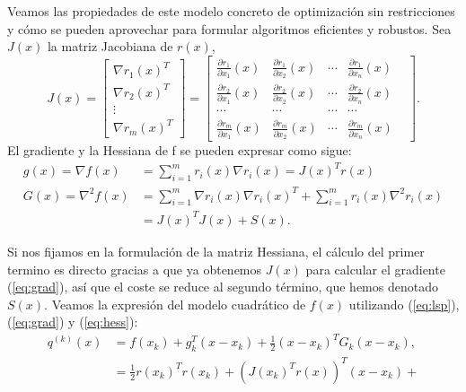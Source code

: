 \documentclass[11pt,a4paper]{book}
\theoremstyle{definition}
\theoremstyle{remark}
\begin{document}
Veamos las propiedades de este modelo concreto de optimización sin restricciones y cómo se pueden aprovechar para formular algoritmos eficientes y robustos.
Sea $J(x)$ la matriz Jacobiana de $r(x)$, 
\begin{equation}
	J(x) = 
	\begin{bmatrix}
		\nabla r_1(x)^T \\
		\nabla r_2(x)^T \\
		\vdots \\
		\nabla r_m(x)^T
	\end{bmatrix}
	=
	\begin{bmatrix}
		\frac{\partial r_1}{\partial x_1}(x) &
		\frac{\partial r_1}{\partial x_2}(x) &
		\cdots &
		\frac{\partial r_1}{\partial x_n}(x) \\
		
		\frac{\partial r_2}{\partial x_1}(x) &
		\frac{\partial r_2}{\partial x_2}(x) &
		\cdots &
		\frac{\partial r_2}{\partial x_n}(x) \\
		
		\cdots &
		\cdots &
		\cdots &
		\cdots & \\
		
		\frac{\partial r_m}{\partial x_1}(x) &
		\frac{\partial r_m}{\partial x_2}(x) &
		\cdots &
		\frac{\partial r_m}{\partial x_n}(x) 
	\end{bmatrix}.
\end{equation}
El gradiente y la Hessiana de f se pueden expresar como sigue:
\begin{align}
	g(x) = \nabla f(x) &= \sum_{i=1}^m r_i(x) \nabla r_i(x) = J(x)^Tr(x) \label{eq:grad}\\
	G(x) = \nabla^2 f(x) &= \sum_{i=1}^m \nabla r_i(x) \nabla r_i(x)^T + \sum_{i=1}^m r_i(x)\nabla^2r_i(x) \nonumber \\
	&= J(x)^TJ(x)+S(x). \label{eq:hess}
\end{align}

Si nos fijamos en la formulación de la matriz Hessiana, el cálculo del primer termino es directo gracias a que ya obtenemos $J(x)$ para calcular el gradiente (\ref{eq:grad}), así que el coste se reduce al segundo término, que hemos denotado $S(x)$.
Veamos la expresión del modelo cuadrático de $f(x)$ utilizando (\ref{eq:lsp}), (\ref{eq:grad}) y (\ref{eq:hess}):
\begin{equation}
\begin{split}
	q^{(k)}(x) &= f(x_k) + g^T_k(x-x_k) + \frac{1}{2}(x-x_k)^TG_k(x-x_k), \\
	&= \frac{1}{2}r(x_k)^Tr(x_k) + (J(x_k)^Tr(x))^T(x-x_k) + 	
\end{split}
\end{equation}
\end{document}
